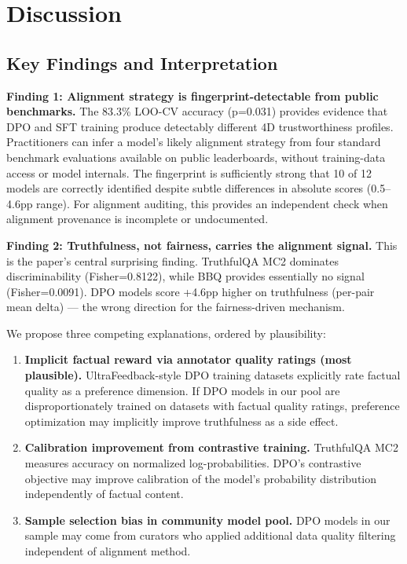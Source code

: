 \section{Discussion}
\label{sec:discussion}

\subsection{Key Findings and Interpretation}

\textbf{Finding 1: Alignment strategy is fingerprint-detectable from public benchmarks.}
The 83.3\% LOO-CV accuracy (p=0.031) provides evidence that DPO and SFT training produce
detectably different 4D trustworthiness profiles. Practitioners can infer a model's
likely alignment strategy from four standard benchmark evaluations available on public
leaderboards, without training-data access or model internals. The fingerprint is
sufficiently strong that 10 of 12 models are correctly identified despite subtle
differences in absolute scores (0.5--4.6pp range). For alignment auditing, this provides
an independent check when alignment provenance is incomplete or undocumented.

\textbf{Finding 2: Truthfulness, not fairness, carries the alignment signal.}
This is the paper's central surprising finding. TruthfulQA MC2 dominates discriminability
(Fisher=0.8122), while BBQ provides essentially no signal (Fisher=0.0091). DPO models
score +4.6pp higher on truthfulness (per-pair mean delta) --- the wrong direction for the fairness-driven mechanism.

We propose three competing explanations, ordered by plausibility:

\begin{enumerate}
  \item \textbf{Implicit factual reward via annotator quality ratings (most plausible).} UltraFeedback-style
    DPO training datasets explicitly rate factual quality as a preference dimension.
    If DPO models in our pool are disproportionately trained on datasets with factual quality
    ratings, preference optimization may implicitly improve truthfulness as a side effect.

  \item \textbf{Calibration improvement from contrastive training.} TruthfulQA MC2 measures
    accuracy on normalized log-probabilities. DPO's contrastive objective may improve
    calibration of the model's probability distribution independently of factual content.

  \item \textbf{Sample selection bias in community model pool.} DPO models in our sample may come
    from curators who applied additional data quality filtering independent of alignment method.
\end{enumerate}

